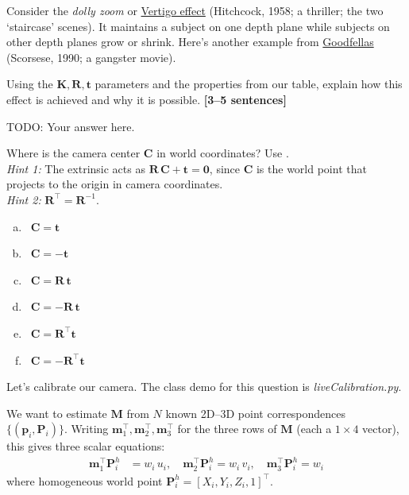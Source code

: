 \documentclass{csci1430}
\begin{document}
\begin{subquestion}[points=2]
Consider the \emph{dolly zoom} or \href{https://www.youtube.com/watch?v=G7YJkBcRWB8}{Vertigo effect} (Hitchcock, 1958; a thriller; the two `staircase' scenes). It maintains a subject on one depth plane while subjects on other depth planes grow or shrink. Here's another example from \href{https://www.youtube.com/watch?v=HZNBtx6RAn4}{Goodfellas} (Scorsese, 1990; a gangster movie).

Using the $\mathbf{K},\mathbf{R},\mathbf{t}$ parameters and the properties from our table, explain how this effect is achieved and why it is possible.
\textbf{[3--5 sentences]}
\end{subquestion}

\begin{answer}[height=12]
TODO: Your answer here.
\end{answer}


\begin{subquestion}[points=1]
Where is the camera center $\mathbf{C}$ in world coordinates? Use \filled. \\
\emph{Hint 1:} The extrinsic acts as $\mathbf{R}\,\mathbf{C} + \mathbf{t} = \mathbf{0}$, since $\mathbf{C}$ is the world point that projects to the origin in camera coordinates.\\
\emph{Hint 2:} $\mathbf{R}^\top = \mathbf{R}^{-1}$.
\end{subquestion}
\begin{answer}[height=9]
\begin{enumerate}[(a),leftmargin=12pt]
    \item \cbox~$\mathbf{C} = \mathbf{t}$
    \item \cbox~$\mathbf{C} = -\mathbf{t}$
    \item \cbox~$\mathbf{C} = \mathbf{R}\,\mathbf{t}$
    \item \cbox~$\mathbf{C} = -\mathbf{R}\,\mathbf{t}$
    \item \cbox~$\mathbf{C} = \mathbf{R}^{\top} \mathbf{t}$
    \item \cbox~$\mathbf{C} = -\mathbf{R}^{\top} \mathbf{t}$
\end{enumerate}
\end{answer}


\pagebreak

\begin{question}[points=13,drawbox=false]
Let's calibrate our camera. The class demo for this question is \emph{liveCalibration.py}.

We want to estimate $\mathbf{M}$ from $N$ known 2D--3D point correspondences $\{(\mathbf{p}_i, \mathbf{P}_i)\}$. Writing $\mathbf{m}_1^\top, \mathbf{m}_2^\top, \mathbf{m}_3^\top$ for the three rows of $\mathbf{M}$ (each a $1\times4$ vector), this gives three scalar equations:
%
\begin{align*}
\mathbf{m}_1^\top \mathbf{P}_i^h &= w_i\, u_i, \quad
\mathbf{m}_2^\top \mathbf{P}_i^h = w_i\, v_i, \quad
\mathbf{m}_3^\top \mathbf{P}_i^h = w_i
\end{align*}
%
where homogeneous world point $\mathbf{P}_i^h = [X_i, Y_i, Z_i, 1]^\top$.
\end{question}
\end{document}
